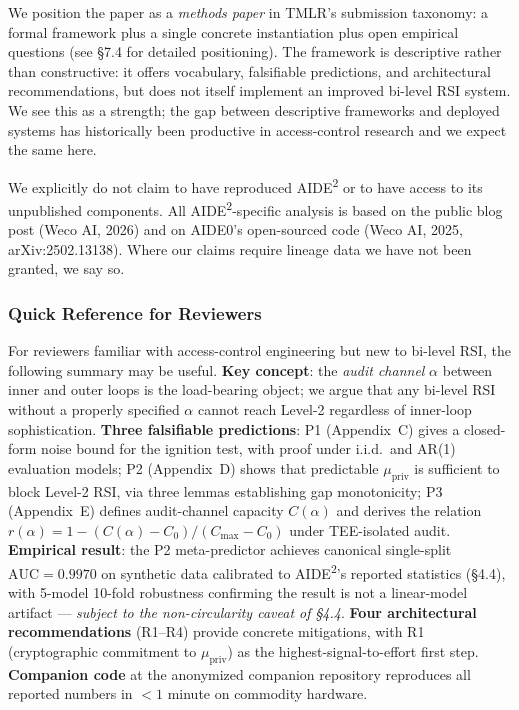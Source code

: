 \documentclass{article}
\theoremstyle{definition}
\begin{document}
We position the paper as a \emph{methods paper} in TMLR's submission taxonomy: a formal framework plus a single concrete instantiation plus open empirical questions (see \S7.4 for detailed positioning). The framework is descriptive rather than constructive: it offers vocabulary, falsifiable predictions, and architectural recommendations, but does not itself implement an improved bi-level RSI system. We see this as a strength; the gap between descriptive frameworks and deployed systems has historically been productive in access-control research and we expect the same here.

We explicitly do not claim to have reproduced AIDE\textsuperscript{2} or to have access to its unpublished components. All AIDE\textsuperscript{2}-specific analysis is based on the public blog post (Weco AI, 2026) and on AIDE0's open-sourced code (Weco AI, 2025, arXiv:2502.13138). Where our claims require lineage data we have not been granted, we say so.

\subsubsection{Quick Reference for Reviewers}

For reviewers familiar with access-control engineering but new to bi-level RSI, the following summary may be useful. \textbf{Key concept}: the \emph{audit channel} $\alpha$ between inner and outer loops is the load-bearing object; we argue that any bi-level RSI without a properly specified $\alpha$ cannot reach Level-2 regardless of inner-loop sophistication. \textbf{Three falsifiable predictions}: P1 (Appendix~C) gives a closed-form noise bound for the ignition test, with proof under i.i.d.\ and AR(1) evaluation models; P2 (Appendix~D) shows that predictable $\mu_{\text{priv}}$ is sufficient to block Level-2 RSI, via three lemmas establishing gap monotonicity; P3 (Appendix~E) defines audit-channel capacity $C(\alpha)$ and derives the relation $r(\alpha) = 1 - (C(\alpha) - C_0)/(C_{\max} - C_0)$ under TEE-isolated audit. \textbf{Empirical result}: the P2 meta-predictor achieves canonical single-split $\text{AUC} = 0.9970$ on synthetic data calibrated to AIDE\textsuperscript{2}'s reported statistics (\S4.4), with 5-model 10-fold robustness confirming the result is not a linear-model artifact --- \emph{subject to the non-circularity caveat of \S4.4}. \textbf{Four architectural recommendations} (R1--R4) provide concrete mitigations, with R1 (cryptographic commitment to $\mu_{\text{priv}}$) as the highest-signal-to-effort first step. \textbf{Companion code} at the anonymized companion repository reproduces all reported numbers in $<1$ minute on commodity hardware.
\end{document}
